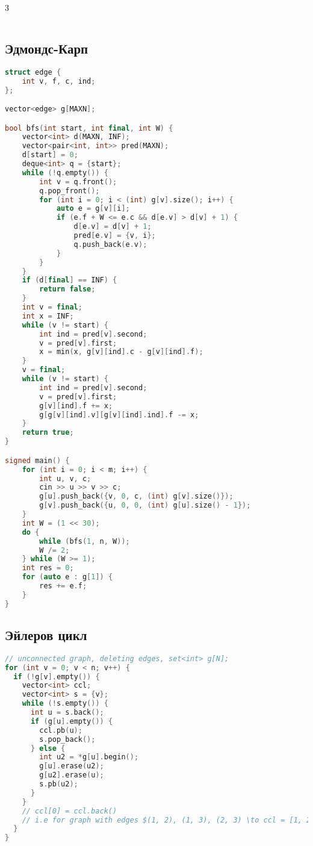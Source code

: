 \documentclass[10pt,a4paper,landscape,twosided]{extarticle}
\begin{document}
\begin{multicols*}{3}
\begin{lstlisting}[language=C++]
\end{lstlisting}

\subsection{Эдмондс-Карп}
\begin{lstlisting}[language=C++]
struct edge {
    int v, f, c, ind;
};

vector<edge> g[MAXN];

bool bfs(int start, int final, int W) {
    vector<int> d(MAXN, INF);
    vector<pair<int, int>> pred(MAXN);
    d[start] = 0;
    deque<int> q = {start};
    while (!q.empty()) {
        int v = q.front();
        q.pop_front();
        for (int i = 0; i < (int) g[v].size(); i++) {
            auto e = g[v][i];
            if (e.f + W <= e.c && d[e.v] > d[v] + 1) {
                d[e.v] = d[v] + 1;
                pred[e.v] = {v, i};
                q.push_back(e.v);
            }
        }
    }
    if (d[final] == INF) {
        return false;
    }
    int v = final;
    int x = INF;
    while (v != start) {
        int ind = pred[v].second;
        v = pred[v].first;
        x = min(x, g[v][ind].c - g[v][ind].f);
    }
    v = final;
    while (v != start) {
        int ind = pred[v].second;
        v = pred[v].first;
        g[v][ind].f += x;
        g[g[v][ind].v][g[v][ind].ind].f -= x;
    }
    return true;
}

signed main() {
    for (int i = 0; i < m; i++) {
        int u, v, c;
        cin >> u >> v >> c;
        g[u].push_back({v, 0, c, (int) g[v].size()});
        g[v].push_back({u, 0, 0, (int) g[u].size() - 1});
    }
    int W = (1 << 30);
    do {
        while (bfs(1, n, W));
        W /= 2;
    } while (W >= 1);
    int res = 0;
    for (auto e : g[1]) {
        res += e.f;
    }
}

\end{lstlisting}

\subsection{Эйлеров цикл}
\begin{lstlisting}[language=C++]
// unconnected graph, deleting edges, set<int> g[N];
for (int v = 0; v < n; v++) {
  if (!g[v].empty()) {
    vector<int> ccl;
    vector<int> s = {v};
    while (!s.empty()) {
      int u = s.back();
      if (g[u].empty()) {
        ccl.pb(u);
        s.pop_back();
      } else {
        int u2 = *g[u].begin();
        g[u].erase(u2);
        g[u2].erase(u);
        s.pb(u2);
      }
    }
    // ccl[0] = ccl.back()
    // i.e for graph with edges $(1, 2), (1, 3), (2, 3) \to ccl = [1, 2, 3, 1]$
  }
}
\end{lstlisting}


\end{multicols*}
\end{document}
